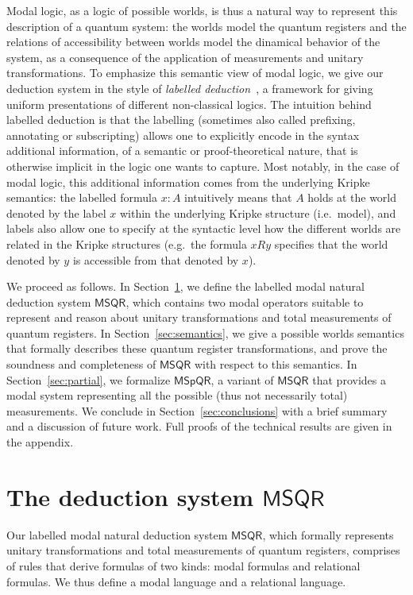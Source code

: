 \documentclass[times, 10pt]{article}
\newcommand{\MSQR}{\textsf{MSQR}}
\newcommand{\MSpQR}{\textsf{MSpQR}}
\begin{document}
Modal logic, as a logic of possible worlds, is thus a natural way to
represent this description of a quantum system: the worlds model the
quantum registers and the relations of accessibility between worlds
model the dinamical behavior of the system, as a consequence of the
application of measurements and unitary transformations. To emphasize
this semantic view of modal logic, we give our deduction system in the
style of \emph{labelled
  deduction}~\cite{Gabbay96,Simpson93,Vigano00a}, a framework for
giving uniform presentations of different non-classical logics.  The
intuition behind labelled deduction is that the labelling (sometimes
also called prefixing, annotating or subscripting) allows one to
explicitly encode in the syntax additional information, of a semantic
or proof-theoretical nature, that is otherwise implicit in the logic
one wants to capture. Most notably, in the case of modal logic, this
additional information comes from the underlying Kripke semantics: the
labelled formula $x:A$ intuitively means that $A$ holds at the world
denoted by the label $x$ within the underlying Kripke structure
(i.e.~model), and labels also allow one to specify at the syntactic
level how the different worlds are related in the Kripke structures
(e.g.~the formula $x R y$ specifies that the world denoted by $y$ is
accessible from that denoted by $x$).

We proceed as follows. In Section~\ref{sec:syntax}, we define the labelled modal natural deduction system $\MSQR$, which contains two modal operators suitable to represent and reason about unitary transformations and total measurements of quantum registers. In Section~\ref{sec:semantics}, we 
give a  possible worlds semantics that formally describes these quantum register transformations, 
and prove the soundness and completeness of $\MSQR$ with respect to this semantics. In Section~\ref{sec:partial}, we formalize $\MSpQR$, a variant of $\MSQR$ that provides a modal system 
representing all the possible (thus not necessarily total) measurements.  We
conclude in Section~\ref{sec:conclusions} with a brief summary and a discussion of future work.
Full proofs of the technical results are given in the appendix.



\section{The deduction system $\MSQR$}
\label{sec:syntax}

Our labelled modal natural deduction system $\MSQR$, which formally represents unitary transformations and total measurements of quantum registers,
comprises of rules that derive formulas of two kinds: modal formulas and relational formulas. We 
thus define a modal language and a relational language. 
\end{document}
